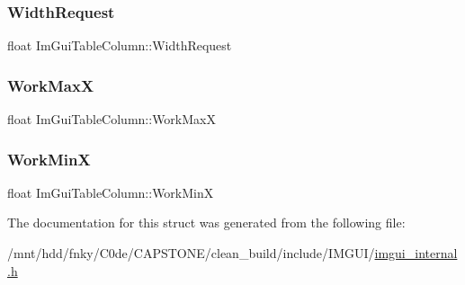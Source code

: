 \subsubsection{\texorpdfstring{Width\+Request}{WidthRequest}}
{\footnotesize\ttfamily float Im\+Gui\+Table\+Column\+::\+Width\+Request}

\mbox{\label{structImGuiTableColumn_a54f5dfe34300039711393b058fb9a867}} 
\subsubsection{\texorpdfstring{Work\+MaxX}{WorkMaxX}}
{\footnotesize\ttfamily float Im\+Gui\+Table\+Column\+::\+Work\+MaxX}

\mbox{\label{structImGuiTableColumn_ad16a4e87ef68cfe781678a078b27f601}} 
\subsubsection{\texorpdfstring{Work\+MinX}{WorkMinX}}
{\footnotesize\ttfamily float Im\+Gui\+Table\+Column\+::\+Work\+MinX}



The documentation for this struct was generated from the following file\+:\begin{DoxyCompactItemize}
\item 
/mnt/hdd/fnky/\+C0de/\+C\+A\+P\+S\+T\+O\+N\+E/clean\+\_\+build/include/\+I\+M\+G\+U\+I/\hyperlink{imgui__internal_8h}{imgui\+\_\+internal.\+h}\end{DoxyCompactItemize}
